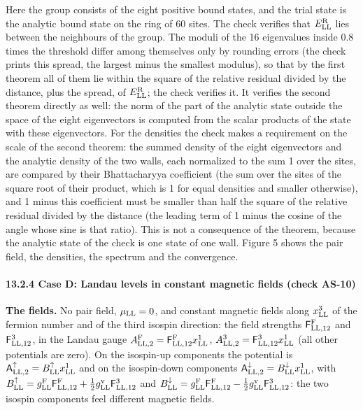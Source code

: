 \documentclass[
  10pt,
]{article}
\begin{document}
Here the group consists of the eight positive bound states, and the
trial state is the analytic bound state on the ring of 60 sites. The
check verifies that \(E^{\rm R}_{\rm LL}\) lies between the neighbours
of the group. The moduli of the 16 eigenvalues inside 0.8 times the
threshold differ among themselves only by rounding errors (the check
prints this spread, the largest minus the smallest modulus), so that by
the first theorem all of them lie within the square of the relative
residual divided by the distance, plus the spread, of
\(E^{\rm R}_{\rm LL}\); the check verifies it. It verifies the second
theorem directly as well: the norm of the part of the analytic state
outside the space of the eight eigenvectors is computed from the scalar
products of the state with these eigenvectors. For the densities the
check makes a requirement on the scale of the second theorem: the summed
density of the eight eigenvectors and the analytic density of the two
walls, each normalized to the sum 1 over the sites, are compared by
their Bhattacharyya coefficient (the sum over the sites of the square
root of their product, which is 1 for equal densities and smaller
otherwise), and 1 minus this coefficient must be smaller than half the
square of the relative residual divided by the distance (the leading
term of 1 minus the cosine of the angle whose sine is that ratio). This
is not a consequence of the theorem, because the analytic state of the
check is one state of one wall. Figure 5 shows the pair field, the
densities, the spectrum and the convergence.

\hypertarget{case-d-landau-levels-in-constant-magnetic-fields-check-as-10}{%
\paragraph{13.2.4 Case D: Landau levels in constant magnetic fields
(check
AS-10)}\label{case-d-landau-levels-in-constant-magnetic-fields-check-as-10}}

\textbf{The fields.} No pair field, \(\mu_{\rm LL}=0\), and constant
magnetic fields along \(x^3_{\rm LL}\) of the fermion number and of the
third isospin direction: the field strengths
\(\mathsf F^{\rm F}_{{\rm LL},12}\) and \(\mathsf F^3_{{\rm LL},12}\),
in the Landau gauge
\(A^{\rm F}_{{\rm LL},2}=\mathsf F^{\rm F}_{{\rm LL},12}x^1_{\rm LL}\),
\(A^3_{{\rm LL},2}=\mathsf F^3_{{\rm LL},12}x^1_{\rm LL}\) (all other
potentials are zero). On the isospin-up components the potential is
\(\mathsf A^\uparrow_{{\rm LL},2}=B^\uparrow_{\rm LL}x^1_{\rm LL}\) and
on the isospin-down components
\(\mathsf A^\downarrow_{{\rm LL},2}=B^\downarrow_{\rm LL}x^1_{\rm LL}\),
with
\(B^\uparrow_{\rm LL}=g^{\rm F}_{\rm LL}\mathsf F^{\rm F}_{{\rm LL},12}+\tfrac12g^{\rm v}_{\rm LL}\mathsf F^3_{{\rm LL},12}\)
and
\(B^\downarrow_{\rm LL}=g^{\rm F}_{\rm LL}\mathsf F^{\rm F}_{{\rm LL},12}-\tfrac12g^{\rm v}_{\rm LL}\mathsf F^3_{{\rm LL},12}\):
the two isospin components feel different magnetic fields.
\end{document}
